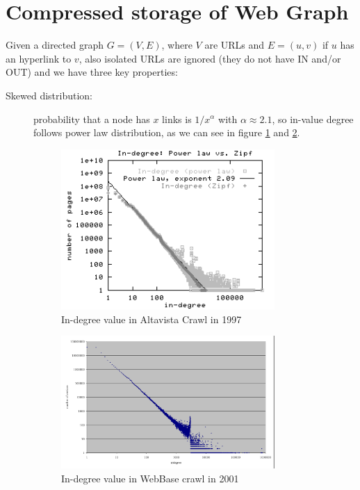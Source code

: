 \section{Compressed storage of Web Graph}
    Given a directed graph $G = (V, E)$, where $V$ are URLs and $E = (u, v)$ if $u$ has an hyperlink to $v$, also isolated URLs are ignored (they do not have IN and/or OUT)
    and we have three key properties:
    \begin{description}
	    \item [Skewed distribution: ] probability that a node has $x$ links is $1/x^{\alpha}$ with $\alpha \approx 2.1$, so in-value degree follows power law distribution, 
		    			  as we can see in figure \ref{img:altavistaCrawl} and \ref{img:webbaseCrawl}.

					  \begin{figure}
						  \includegraphics[width=0.8\textwidth]{Images/altavistaCrawl}
						  \caption{In-degree value in Altavista Crawl in 1997}
						  \label{img:altavistaCrawl}
					  \end{figure}

					  \begin{figure}
						  \includegraphics[width=0.8\textwidth]{Images/webBaseCrawl}
						  \caption{In-degree value in WebBase crawl in 2001}
						  \label{img:webbaseCrawl}
					  \end{figure}
						  

\end{description}
